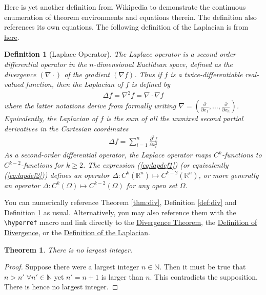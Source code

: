 \documentclass[10pt]{article}
\newtheorem{theorem}{Theorem}
\newtheorem{definition}{Definition}
\begin{document}
Here is yet another definition from Wikipedia to demonstrate the
continuous enumeration of theorem environments and equations
therein. The definition also references its own equations. The
following definition of the Laplacian is from
\href{http://en.wikipedia.org/wiki/Laplace_operator}{here}.
\begin{definition}[Laplace Operator]
  \label{def:lap}
  The Laplace operator is a second order differential operator in the
  $n$-dimensional Euclidean space, defined as the divergence
  $(\nabla\cdot)$ of the gradient $(\nabla f)$. Thus if $f$ is a
  twice-differentiable real-valued function, then the Laplacian of $f$
  is defined by
  \begin{align}
    \label{eq:lapdef1}
    \Delta f = \nabla^2f = \nabla\cdot\nabla f
  \end{align}
  where the latter notations derive from formally writing $\nabla =
  \left(\frac{\partial}{\partial x_1}, \ldots,
    \frac{\partial}{\partial x_n}\right)$. Equivalently, the Laplacian
  of $f$ is the sum of all the unmixed second partial derivatives in the
  Cartesian coordinates
  \begin{align}
    \label{eq:lapdef2}
    \Delta f = \sum_{i=1}^n \frac{\partial^2f}{\partial x_i^2}
  \end{align}
  As a second-order differential operator, the Laplace operator maps
  $C^k$-functions to $C^{k-2}$-functions for $k\geq 2$. The expression
  (\ref{eq:lapdef1}) (or equivalently (\ref{eq:lapdef2})) defines an
  operator $\Delta : C^k(\mathbb{R}^n) \mapsto
  C^{k-2}(\mathbb{R}^n)$, or more generally an operator $\Delta :
  C^k(\Omega) \mapsto C^{k-2}(\Omega)$ for any open set $\Omega$.
\end{definition}

You can numerically reference Theorem \ref{thm:div}, Definition
\ref{def:div} and Definition \ref{def:lap} as usual. Alternatively,
you may also reference them with the \texttt{\textbackslash{hyperref}}
macro and link directly to the \hyperref[thm:div]{Divergence Theorem},
the \hyperref[def:div]{Definition of Divergence}, or the
\hyperref[def:div]{Definition of the Laplacian}.

\begin{theorem}
  \label{thm:no_largest_int}
  There is no largest integer.
\end{theorem}
\begin{proof}
  Suppose there were a largest integer $n\in\mathbb{N}$. Then it must
  be true that $n > n'\;\forall n'\in\mathbb{N}$ yet $n' = n + 1$
  is larger than $n$. This contradicts the supposition. There is hence
  no largest integer.
\end{proof}
\end{document}
